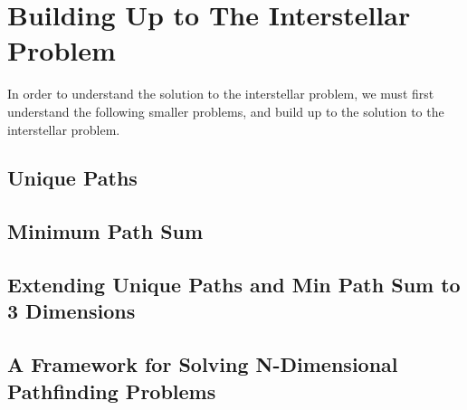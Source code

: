 \section{Building Up to The Interstellar Problem}
In order to understand the solution to the interstellar problem, we must first understand the following smaller problems,
and build up to the solution to the interstellar problem.

\subsection{Unique Paths}


\subsection{Minimum Path Sum}


\subsection{Extending Unique Paths and Min Path Sum to 3 Dimensions}


\subsection{A Framework for Solving N-Dimensional Pathfinding Problems}
